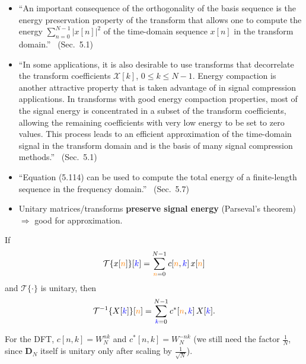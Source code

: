 \documentclass[handout_subfiles_root.tex]{subfiles}
\newcommand{\HandoutN}{\textcolor{orange}{n}}
\newcommand{\HandoutK}{\textcolor{ee483link}{k}}
\begin{document}
\begin{notebox}[title={\texorpdfstring{Mitra's view\hfill\normalfont\small\textit{(addendum to orig lecture note)}}{Mitra's view (addendum)}}]
\begin{itemize}
  \item ``An important consequence of the orthogonality of the basis sequence is the energy preservation property of the transform that allows one to compute the energy $\sum_{n=0}^{N-1}|x[n]|^2$ of the time-domain sequence $x[n]$ in the transform domain.'' \ (Sec.~5.1)\footnotemark
  \item ``In some applications, it is also desirable to use transforms that decorrelate the transform coefficients $\mathcal{X}[k]$, $0\le k\le N-1$. Energy compaction is another attractive property that is taken advantage of in signal compression applications. In transforms with good energy compaction properties, most of the signal energy is concentrated in a subset of the transform coefficients, allowing the remaining coefficients with very low energy to be set to zero values. This process leads to an efficient approximation of the time-domain signal in the transform domain and is the basis of many signal compression methods.'' \ (Sec.~5.1)
  \item ``Equation (5.114) can be used to compute the total energy of a finite-length sequence in the frequency domain.'' \ (Sec.~5.7)
\end{itemize}
\end{notebox}


\begin{itemize}
  \item Unitary matrices/transforms \textbf{preserve signal energy} (Parseval's theorem) $\Rightarrow$ good for approximation.
\end{itemize}

\begin{factbox}[title={Inverse of a unitary transform}]
If
\begin{equation*}
\mathcal{T}\{x[\HandoutN]\}[\HandoutK] = \sum_{\HandoutN=0}^{N-1} c[\HandoutN,\HandoutK]\,x[\HandoutN]
\end{equation*}
and $\mathcal{T}\{\cdot\}$ is unitary, then
\begin{equation*}
\mathcal{T}^{-1}\{X[\HandoutK]\}[\HandoutN] = \sum_{\HandoutK=0}^{N-1} c^*[\HandoutN,\HandoutK]\,X[\HandoutK].
\end{equation*}
\end{factbox}
\noindent For the DFT, $c[n,k] = W_N^{nk}$ and $c^*[n,k]=W_N^{-nk}$ (we still need the factor $\tfrac{1}{N}$, since $\mathbf{D}_N$ itself is unitary only after scaling by $\tfrac{1}{\sqrt N}$).
\end{document}
